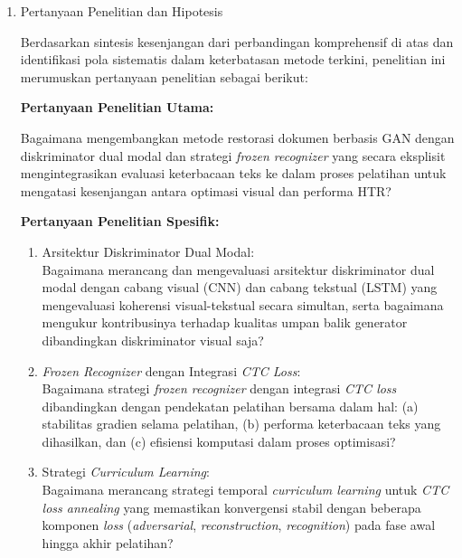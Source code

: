 \begin{enumerate}[leftmargin=*, labelindent=0pt, itemsep=1ex, topsep=0pt]

\item Pertanyaan Penelitian dan Hipotesis

Berdasarkan sintesis kesenjangan dari perbandingan komprehensif di atas dan identifikasi pola sistematis dalam keterbatasan metode terkini, penelitian ini merumuskan pertanyaan penelitian sebagai berikut:

\noindent\textbf{Pertanyaan Penelitian Utama:}

Bagaimana mengembangkan metode restorasi dokumen berbasis GAN dengan diskriminator dual modal dan strategi \textit{frozen recognizer} yang secara eksplisit mengintegrasikan evaluasi keterbacaan teks ke dalam proses pelatihan untuk mengatasi kesenjangan antara optimasi visual dan performa HTR?

\noindent\textbf{Pertanyaan Penelitian Spesifik:}

\begin{enumerate}[leftmargin=1.5em, labelsep=0.5em, itemindent=0pt, label=\arabic*., topsep=0pt, parsep=0pt, itemsep=0pt]
      \item Arsitektur Diskriminator Dual Modal: \\
            Bagaimana merancang dan mengevaluasi arsitektur diskriminator dual modal dengan cabang visual (CNN) dan cabang tekstual (LSTM) yang mengevaluasi koherensi visual-tekstual secara simultan, serta bagaimana mengukur kontribusinya terhadap kualitas umpan balik generator dibandingkan diskriminator visual saja?

      \item \textit{Frozen Recognizer} dengan Integrasi \textit{CTC Loss}: \\
            Bagaimana strategi \textit{frozen recognizer} dengan integrasi \textit{CTC loss} dibandingkan dengan pendekatan pelatihan bersama dalam hal: (a) stabilitas gradien selama pelatihan, (b) performa keterbacaan teks yang dihasilkan, dan (c) efisiensi komputasi dalam proses optimisasi?

      \item Strategi \textit{Curriculum Learning}: \\
            Bagaimana merancang strategi temporal \textit{curriculum learning} untuk \textit{CTC loss annealing} yang memastikan konvergensi stabil dengan beberapa komponen \textit{loss} (\textit{adversarial}, \textit{reconstruction}, \textit{recognition}) pada fase awal hingga akhir pelatihan?


\end{enumerate}
\end{enumerate}
